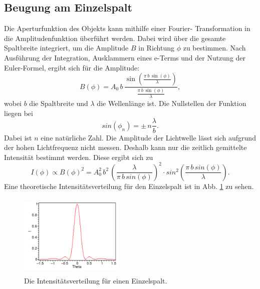 \subsection{Beugung am Einzelspalt}
Die Aperturfunktion des Objekts kann mithilfe einer Fourier-
Transformation in die Amplitudenfunktion überführt werden. %
Dabei wird über die gesamte Spaltbreite integriert, um die 
Amplitude $B$ in Richtung $\phi$ zu bestimmen. Nach Ausführung 
der Integration, Ausklammern eines e-Terms und der Nutzung 
der Euler-Formel, ergibt sich für die Amplitude:
\begin{equation*}
    B(\phi) = A_0 \, b \, \frac{\sin(\frac{\pi \, b \, \sin(\phi)}{\lambda})}{\frac{\pi \, b \, \sin(\phi)}{\lambda}},
\end{equation*}
wobei $b$ die Spaltbreite und $\lambda$ 
die Wellenlänge ist. 
Die Nullstellen der Funktion liegen bei
\begin{equation*} 
    sin(\phi_n)= \pm \, n \frac{\lambda}{b}.
\end{equation*}
Dabei ist $n$ eine natürliche Zahl.
Die Amplitude der Lichtwelle lässt sich aufgrund der hohen 
Lichtfrequenz nicht messen. Deshalb kann nur die zeitlich 
gemittelte Intensität bestimmt werden. 
\newline
Diese ergibt sich zu 
\begin{equation}
    I(\phi) \propto B(\phi)^2 = A^{2}_0 \, b^2 \, \left(\frac{\lambda}{\pi \, b \, sin(\phi)} \right)^2 \cdot sin^2 \left(\frac{\pi \, b \, sin(\phi)}{\lambda}\right).
    \label{eqn:intensität}
\end{equation}
Eine theoretische Intensitätsverteilung für den Einzelspalt
ist in Abb. \ref{fig:einzel} zu sehen.
\begin{figure}
    \centering
    \includegraphics[width=5cm, height=4cm]{build/Einzelspalt.png}
    \caption{Die Intensitätsverteilung für einen Einzelspalt. \cite{einzel}}
    \label{fig:einzel}
\end{figure}

